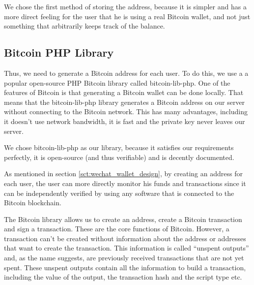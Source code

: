 We chose the first method of storing the address, because it is simpler and has a more direct feeling for the user that he is using a real Bitcoin wallet, and not just something that arbitrarily keeps track of the balance.

\subsection{Bitcoin PHP Library}

Thus, we need to generate a Bitcoin address for each user. To do this, we use a a popular open-source PHP Bitcoin library called bitcoin-lib-php. One of the features of Bitcoin is that generating a Bitcoin wallet can be done locally. That means that the bitcoin-lib-php library generates a Bitcoin address on our server without connecting to the Bitcoin network. This has many advantages, including it doesn't use network bandwidth, it is fast and the private key never leaves our server.

We chose bitcoin-lib-php as our library, because it satisfies our requirements perfectly, it is open-source (and thus verifiable) and is decently documented. 

As mentioned in section \ref{sct:wechat_wallet_design}, by creating an address for each user, the user can more directly monitor his funds and transactions since it can be independently verified by using any software that is connected to the Bitcoin blockchain.

The Bitcoin library allows us to create an address, create a Bitcoin transaction and sign a transaction. These are the core functions of Bitcoin. However, a transaction can't be created without information about the address or addresses that want to create the transaction. This information is called ``unspent outputs'' and, as the name suggests, are previously received transactions that are not yet spent. These unspent outputs contain all the information to build a transaction, including the value of the output, the transaction hash and the script type etc.





